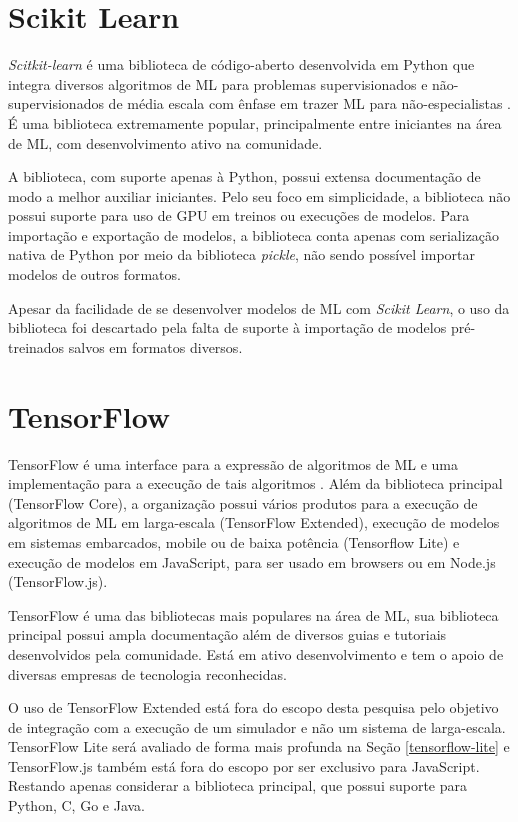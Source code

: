 \section{Scikit Learn}

\textit{Scitkit-learn} é uma biblioteca de código-aberto desenvolvida em Python que integra diversos algoritmos de ML para problemas supervisionados e não-supervisionados de média escala com ênfase em trazer ML para não-especialistas \cite{scikit-learn}. É uma biblioteca extremamente popular, principalmente entre iniciantes na área de ML, com desenvolvimento ativo na comunidade.

A biblioteca, com suporte apenas à Python, possui extensa documentação de modo a melhor auxiliar iniciantes. Pelo seu foco em simplicidade, a biblioteca não possui suporte para uso de GPU em treinos ou execuções de modelos. Para importação e exportação de modelos, a biblioteca conta apenas com serialização nativa de Python por meio da biblioteca \textit{pickle}, não sendo possível importar modelos de outros formatos.

Apesar da facilidade de se desenvolver modelos de ML com \textit{Scikit Learn}, o uso da biblioteca foi descartado pela falta de suporte à importação de modelos pré-treinados salvos em formatos diversos.

\section{TensorFlow}

TensorFlow é uma interface para a expressão de algoritmos de ML e uma implementação para a execução de tais algoritmos \cite{tensorflow-2015}. Além da biblioteca principal (TensorFlow Core), a organização possui vários produtos para a execução de algoritmos de ML em larga-escala (TensorFlow Extended), execução de modelos em sistemas embarcados, mobile ou de baixa potência (Tensorflow Lite) e execução de modelos em JavaScript, para ser usado em browsers ou em Node.js (TensorFlow.js).

TensorFlow é uma das bibliotecas mais populares na área de ML, sua biblioteca principal possui ampla documentação além de diversos guias e tutoriais desenvolvidos pela comunidade. Está em ativo desenvolvimento e tem o apoio de diversas empresas de tecnologia reconhecidas.

O uso de TensorFlow Extended está fora do escopo desta pesquisa pelo objetivo de integração com a execução de um simulador e não um sistema de larga-escala. TensorFlow Lite será avaliado de forma mais profunda na Seção \ref{tensorflow-lite} e TensorFlow.js também está fora do escopo por ser exclusivo para JavaScript. Restando apenas considerar a biblioteca principal, que possui suporte para Python, C, Go e Java.

